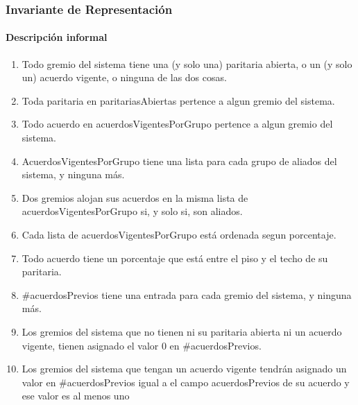 \subsubsection{Invariante de Representaci\'on}

\paragraph{Descripci\'on informal}
\begin{enumerate}

	\item Todo gremio del sistema tiene una (y solo una) paritaria abierta, o un (y solo un) acuerdo vigente, o ninguna de las dos cosas.
	\item Toda paritaria en paritariasAbiertas pertence a algun gremio del sistema.
	\item Todo acuerdo en acuerdosVigentesPorGrupo pertence a algun gremio del sistema.
	\item AcuerdosVigentesPorGrupo tiene una lista para cada grupo de aliados del sistema, y ninguna m\'as.
	\item Dos gremios alojan sus acuerdos en la misma lista de acuerdosVigentesPorGrupo si, y solo si, son aliados.
	\item Cada lista de acuerdosVigentesPorGrupo est\'a ordenada segun porcentaje.
	\item Todo acuerdo tiene un porcentaje que est\'a entre el piso y el techo de su paritaria.
	\item \#acuerdosPrevios tiene una entrada para cada gremio del sistema, y ninguna m\'as.
	\item Los gremios del sistema que no tienen ni su paritaria abierta ni un acuerdo vigente, tienen asignado el valor 0 en \#acuerdosPrevios.
	\item Los gremios del sistema que tengan un acuerdo vigente tendr\'an asignado un valor en \#acuerdosPrevios igual a el campo acuerdosPrevios de su acuerdo y  ese valor es al menos uno


\end{enumerate}

